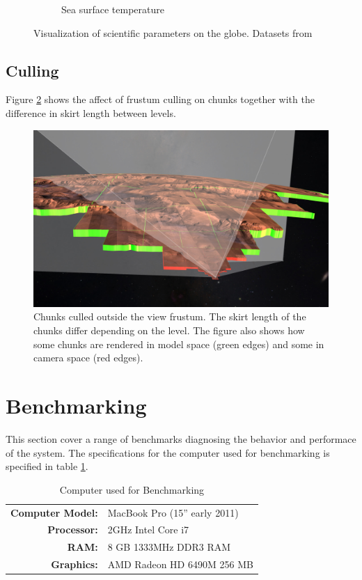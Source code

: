 \begin{figure}[h]
\begin{subfigure}[t]{0.90\textwidth}
        \caption{Sea surface temperature}
    \end{subfigure}
    \caption{Visualization of scientific parameters on the globe. Datasets from \cite{gibs}}
    \label{fig:sciparam}
\end{figure}

\clearpage
\subsection{Culling}
\FloatBarrier

Figure \ref{fig:frustummars} shows the affect of frustum culling on chunks together with the difference in skirt length between levels.

\begin{figure}[h]
    \centering
        \includegraphics[width=\textwidth]{figures/results/screenshots_thesis_old/frustum_mars.jpg}
    \caption{Chunks culled outside the view frustum. The skirt length of the chunks differ depending on the level. The figure also shows how some chunks are rendered in model space (green edges) and some in camera space (red edges).}
    \label{fig:frustummars}
\end{figure}

\clearpage
\section{Benchmarking}
\FloatBarrier
This section cover a range of benchmarks diagnosing the behavior and performace of the system. The specifications for the computer used for benchmarking is specified in table \ref{table:benchmark host}. 

\begin{table}[h]
  \centering
  \caption[]{Computer used for Benchmarking}
    \label{table:benchmark host}
  \begin{tabular}{| r l |}
    \hline
      \textbf{Computer Model:}  & MacBook Pro (15'' early 2011) \\
      \textbf{Processor:}       & 2GHz Intel Core i7 \\
      \textbf{RAM:}             & 8 GB 1333MHz DDR3 RAM \\
      \textbf{Graphics:}        & AMD Radeon HD 6490M 256 MB \\
    \hline
  \end{tabular}
\end{table}



